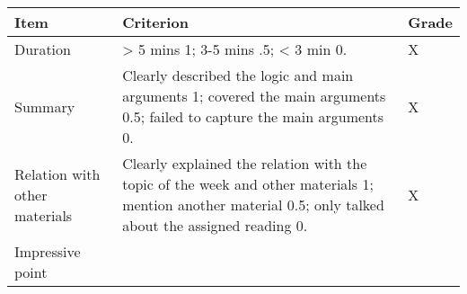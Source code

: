 \documentclass[11pt,]{article}
\theoremstyle{definition}
\theoremstyle{definition}
\theoremstyle{remark}
\begin{document}
\begin{longtable}[]{@{}lll@{}}
\toprule
\begin{minipage}[b]{0.16\columnwidth}\raggedright\strut
Item\strut
\end{minipage} & \begin{minipage}[b]{0.72\columnwidth}\raggedright\strut
Criterion\strut
\end{minipage} & \begin{minipage}[b]{0.04\columnwidth}\raggedright\strut
Grade\strut
\end{minipage}\tabularnewline
\midrule
\endhead
\begin{minipage}[t]{0.16\columnwidth}\raggedright\strut
Duration\strut
\end{minipage} & \begin{minipage}[t]{0.72\columnwidth}\raggedright\strut
\textgreater{} 5 mins 1; 3-5 mins .5; \textless{} 3 min 0.\strut
\end{minipage} & \begin{minipage}[t]{0.04\columnwidth}\raggedright\strut
X\strut
\end{minipage}\tabularnewline
\begin{minipage}[t]{0.16\columnwidth}\raggedright\strut
Summary\strut
\end{minipage} & \begin{minipage}[t]{0.72\columnwidth}\raggedright\strut
Clearly described the logic and main arguments 1; covered the main
arguments 0.5; failed to capture the main arguments 0.\strut
\end{minipage} & \begin{minipage}[t]{0.04\columnwidth}\raggedright\strut
X\strut
\end{minipage}\tabularnewline
\begin{minipage}[t]{0.16\columnwidth}\raggedright\strut
Relation with other materials\strut
\end{minipage} & \begin{minipage}[t]{0.72\columnwidth}\raggedright\strut
Clearly explained the relation with the topic of the week and other
materials 1; mention another material 0.5; only talked about the
assigned reading 0.\strut
\end{minipage} & \begin{minipage}[t]{0.04\columnwidth}\raggedright\strut
X\strut
\end{minipage}\tabularnewline
\begin{minipage}[t]{0.16\columnwidth}\raggedright\strut
Impressive point\strut
\end{minipage} & \begin{minipage}[t]{0.72\columnwidth}\raggedright\strut

\end{minipage}
\end{longtable}
\end{document}
